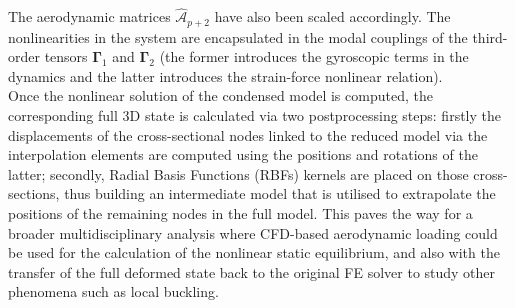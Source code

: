 \documentclass[11pt]{article}
\begin{document}
The aerodynamic matrices \(\hat{\bm{\mathcal{A}}}_{p+2}\) have also been scaled accordingly.
 The nonlinearities in the system are encapsulated in the modal couplings of the third-order tensors \(\pmb{\Gamma}_1\) and \(\pmb{\Gamma}_2\)  (the former introduces the gyroscopic terms in the dynamics and the latter introduces the strain-force nonlinear relation).
\\[0pt]
Once the nonlinear solution of the condensed model is computed, the corresponding full 3D state is calculated via two postprocessing steps: firstly the displacements of the cross-sectional nodes linked to the reduced model via the interpolation elements are computed using the positions and rotations of the latter; secondly, Radial Basis Functions (RBFs) kernels are placed on those cross-sections, thus building an intermediate model that is utilised to extrapolate the positions of the remaining nodes in the full model.
This paves the way for a broader multidisciplinary analysis where CFD-based aerodynamic loading could be used for the calculation of the nonlinear static equilibrium, and also with the transfer of the full deformed state back to the original FE solver to study other phenomena such as local buckling. 
\end{document}
